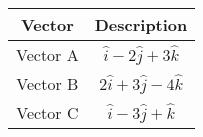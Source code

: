 \begin{tabular}{|c|c|}
	\hline
	Vector&Description\\
	\hline
	Vector A&  \(\hat{i} - 2 \hat{j} + 3 \hat{k}\)\\
	\hline
	Vector B& \(2\hat{i} +3 \hat{j} -4\hat{k}\)\\
	\hline
	Vector C& \(\hat{i} -3\hat{j} +\hat{k}\)\\
	\hline
\end{tabular}
